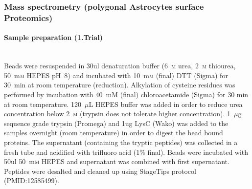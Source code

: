 \documentclass[a4paper,11pt,bibtotocnumbered]{article}
\begin{document}





\subsubsection{Mass spectrometry (polygonal Astrocytes surface Proteomics)}


\paragraph{Sample preparation (1.Trial)} $~$ \\

Beads were resuspended in 30ul denaturation buffer (6~\textsc{m} urea, 2~\textsc{m} thiourea, 50~m\textsc{m} HEPES pH~8) and incubated with 10~m\textsc{m} (final) DTT (Sigma) for 30~min at room temperature (reduction). Alkylation of cysteine residues was performed by incubation with 40~mM (final) chloroacetamide (Sigma) for 30 min at room temperature. 120~$\mu$L HEPES buffer was added in order to reduce urea concentration below 2~\textsc{m} (trypsin does not tolerate higher concentration). 1~$\mu$g sequence grade trypsin (Promega) and 1ug LysC (Wako) was added to the samples overnight (room temperature) in order to digest the bead bound proteins. The supernatant (containing the tryptic peptides) was collected in a fresh tube and acidified with trifluoro acid (1\% final). Beads were incubated with 50ul 50~m\textsc{m} HEPES and supernatant was combined with first supernatant. Peptides were desalted and cleaned up using StageTips protocol (PMID:12585499). 
\end{document}

